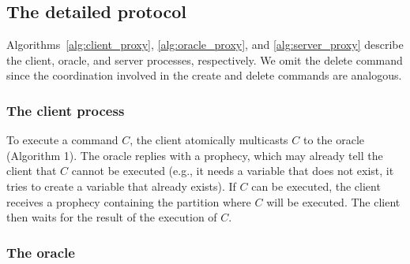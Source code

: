 \subsection{The detailed protocol}
\label{sec:dynastar-detailed}







Algorithms~\ref{alg:client_proxy}, \ref{alg:oracle_proxy}, and
\ref{alg:server_proxy} describe the client, oracle, and server processes,
respectively. We omit the delete command since the coordination involved in the
create and delete commands are analogous.

\subsubsection{The client process}

To execute a command $C$, the client atomically multicasts $C$ to the oracle
(Algorithm 1). The oracle replies with a prophecy, which may already tell the
client that $C$ cannot be executed (e.g., it needs a variable that does not
exist, it tries to create a variable that already exists). If $C$ can be
executed, the client receives a prophecy containing the partition where $C$ will
be executed. The client then waits for the result of the execution of $C$.




\subsubsection{The oracle}

